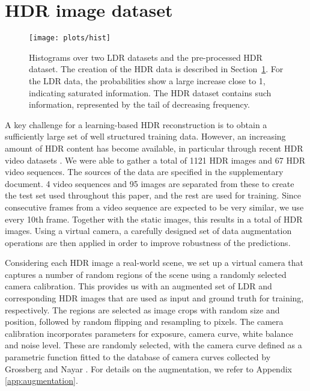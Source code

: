 \documentclass[acmtog]{acmart}
\newcommand{\secref}[1]{Section~\ref{sec:#1}}
\newcommand\belowfigspace{-2pt}
\begin{document}
\section{HDR image dataset}\label{sec:hdr_db}
\begin{figure}
	\vspace{-2pt}
	\centering
	\texttt{[image: plots/hist]}
	\vspace{-10pt}
	\caption{\label{fig:hist} Histograms over two LDR datasets and the pre-processed HDR dataset. The creation of the HDR data is described in \secref{hdr_db}. For the LDR data, the probabilities show a large increase close to 1, indicating saturated information. The HDR dataset contains such information, represented by the tail of decreasing frequency.} 
	\vspace{\belowfigspace}
\end{figure}

A key challenge for a learning-based HDR reconstruction is to obtain a sufficiently large set of well structured training data.  However, an increasing amount of HDR content has become available, in particular through recent HDR video datasets \cite{Froehlich2014,Kronander2014,Azimi2014,Boitard2014}. We were able to gather a total of 1121 HDR images and 67 HDR video sequences. The sources of the data are specified in the supplementary document. 4 video sequences and 95 images are separated from these to create the test set used throughout this paper, and the rest are used for training. Since consecutive frames from a video sequence are expected to be very similar, we use every 10th frame. Together with the static images, this results in a total of  HDR images. Using a virtual camera, a carefully designed set of data augmentation operations are then applied in order to improve robustness of the predictions.

Considering each HDR image a real-world scene, we set up a virtual camera that captures a number of random regions of the scene using a randomly selected camera calibration. This provides us with an augmented set of LDR and corresponding HDR images that are used as input and ground truth for training, respectively. The regions are selected as image crops with random size and position, followed by random flipping and resampling to  pixels. The camera calibration incorporates parameters for exposure, camera curve, white balance and noise level. These are randomly selected, with the camera curve defined as a parametric function fitted to the database of camera curves collected by Grossberg and Nayar \citeyear{Grossberg2003}. For details on the augmentation, we refer to Appendix \ref{app:augmentation}.
\end{document}
